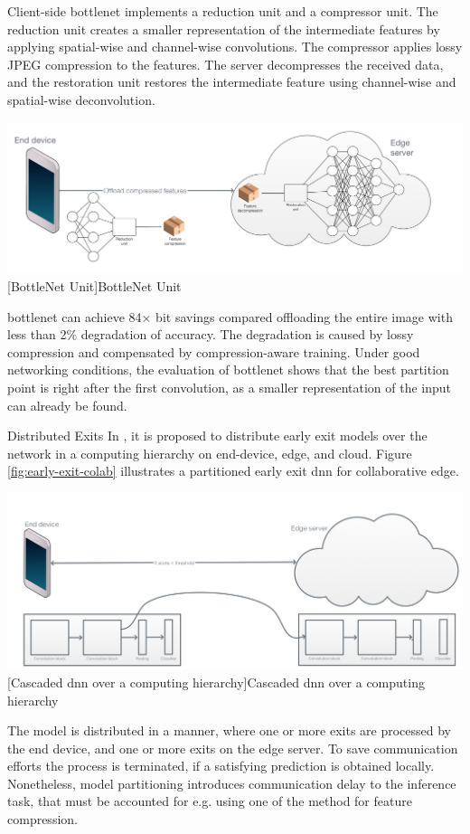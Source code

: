 \begin{enumdescript}
	Client-side \gls{bottlenet} implements a reduction unit and a compressor unit. The reduction unit creates a smaller representation of the intermediate features by applying spatial-wise and channel-wise convolutions. The compressor applies lossy JPEG compression to the features. The server decompresses the received data, and the restoration unit restores the intermediate feature using channel-wise and spatial-wise deconvolution.	
	\begin{minipage}[t]{\linewidth}
		\centering
		\includegraphics[width=.8\linewidth]{figures/models/bottlenet}
		[BottleNet Unit]{BottleNet Unit}
	\end{minipage}
	
	\gls{bottlenet} can achieve 84$\times$ bit savings compared offloading the entire image with less than 2\% degradation of accuracy. The degradation is caused by lossy compression and compensated by compression-aware training. Under good networking conditions, the evaluation of \gls{bottlenet} shows that the best partition point is right after the first convolution, as a smaller representation of the input can already be found. 	
	\item[Distributed Exits] In \cite{leroux_cascading_2017,teerapittayanon_distributed_2017}, it is proposed to distribute early exit models over the network in a computing hierarchy on end-device, edge, and cloud. Figure \ref{fig:early-exit-colab} illustrates a partitioned early exit \gls{dnn} for collaborative edge. 
	
	\begin{minipage}[t]{\linewidth}
		\centering
		\includegraphics[width=\linewidth]{figures/models/cascaded}
		[Cascaded \gls{dnn} over a computing hierarchy]{Cascaded \gls{dnn} over a computing hierarchy}
		\label{fig:early-exit-colab}
	\end{minipage}
	The model is distributed in a manner, where one or more exits are processed by the end device, and one or more exits on the edge server. To save communication efforts the process is terminated, if a satisfying prediction is obtained locally. Nonetheless, model partitioning introduces communication delay to the inference task, that must be accounted for e.g. using one of the method for feature compression.
	

\end{enumdescript}
